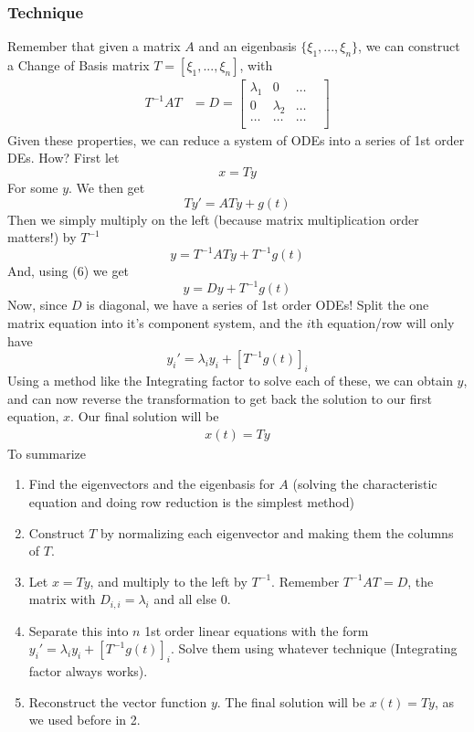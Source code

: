 \documentclass[11pt]{article}
\begin{document}
\subsubsection{Technique}
Remember that given a matrix $A$ and an eigenbasis $\{\xi_1, ..., \xi_n\}$, we can construct a
Change of Basis matrix $T = \left[ \xi_1, ..., \xi_n \right]$, with 
\begin{align}
    T^{-1}AT &= D = \begin{bmatrix} 
                        \lambda_1 & 0 & \dots & \\
                        0 & \lambda_2 & \dots \\
                        \dots & \dots & \dots \\
                    \end{bmatrix} 
\end{align}
Given these properties, we can reduce a system of ODEs into a series of 1st order DEs. How? First
let 
    \[ x = Ty \] 
For some $y$. We then get
    \[ Ty' = ATy + g(t) \]
Then we simply multiply on the left (because matrix multiplication order matters!) by $T^{-1}$
    \[ y = T^{-1}ATy + T^{-1}g(t) \]
And, using (6) we get
    \[ y = Dy + T^{-1}g(t) \]
Now, since $D$ is diagonal, we have a series of 1st order ODEs! Split the one matrix equation into
it's component system, and the $i$th equation/row will only have 
    \[y_i' = \lambda_i y_i + \left[ T^{-1}g(t) \right]_i \]  
Using a method like the Integrating factor to solve each of these, we can obtain $y$, and can now reverse
the transformation to get back the solution to our first equation, $x$. Our final solution will be
\begin{align*}
    x(t) = Ty
\end{align*}
To summarize
\begin{enumerate}
    \item Find the eigenvectors and the eigenbasis for $A$ (solving the characteristic equation and doing 
          row reduction is the simplest method)
    \item Construct $T$ by normalizing each eigenvector and making them the columns of $T$.
    \item Let $x = Ty$, and multiply to the left by $T^{-1}$. Remember $T^{-1}AT = D$, the matrix
          with $D_{i,i} = \lambda_i$ and all else $0$. 
    \item Separate this into $n$ 1st order linear equations with the form 
            $y_i' = \lambda_i y_i + \left[ T^{-1}g(t) \right]_i $. Solve them using whatever technique (Integrating
          factor always works).
    \item Reconstruct the vector function $y$. The final solution will be $x(t) = Ty$, as we used before
          in 2.
\end{enumerate}
\end{document}

